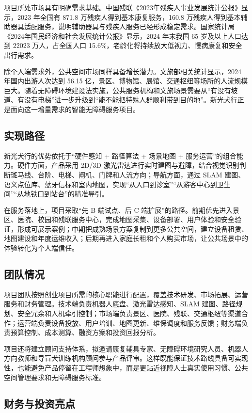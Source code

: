 \documentclass[a4paper,fontset=none]{ctexart}
\begin{document}
项目所处市场具有明确需求基础。中国残联《2023年残疾人事业发展统计公报》显示，2023 年全国有 871.8 万残疾人得到基本康复服务，160.8 万残疾人得到基本辅助器具适配服务，说明辅助器具与残疾人服务已经形成稳定需求。国家统计局《2024年国民经济和社会发展统计公报》显示，2024 年末我国 65 岁及以上人口达到 22023 万人，占全国人口 15.6\%，老龄化将持续放大低视力、慢病康复和安全出行需求。

除个人端需求外，公共空间市场同样具备增长潜力。文旅部相关统计显示，2024 年国内出游人次达到 56.15 亿，景区、博物馆、展馆、交通枢纽等场所的人流规模巨大。随着无障碍环境建设法实施，公共服务机构和文旅场景需要从“有没有坡道、有没有电梯”进一步升级到“能不能把特殊人群顺利带到目的地”。新光犬行正是面向这一增量需求的智能无障碍服务项目。

\subsection{实现路径}

新光犬行的优势依托于“硬件感知 + 路径算法 + 场景地图 + 服务运营”的组合能力。硬件方面，产品采用 2D/3D 激光雷达进行实时建图与避障，结合视觉识别判断斑马线、台阶、电梯、闸机、门牌和人流方向；导航方面，通过 SLAM 建图、语义点位库、蓝牙信标和室内地图，实现“从入口到诊室”“从游客中心到卫生间”“从地铁口到站台”的精准导引。

在服务落地上，项目采取“先 B 端试点、后 C 端扩展”的路径。前期优先进入景区、医院、校园和残联服务中心，完成地图采集、设备部署、用户体验和安全验证，形成可展示案例；中期把成熟场景方案复制到更多公共空间，建立设备租赁、地图建设和年度运维收入；后期再进入家庭长租和个人购买市场，让公共场景中的体验转化为个人端信任。

\subsection{团队情况}

项目团队按照创业项目所需的核心职能进行配置，覆盖技术研发、市场拓展、运营服务和财务管理。技术端负责机器人底盘、激光雷达感知、SLAM 建图、路径规划、安全冗余和人机牵引控制；市场端负责景区、医院、残联、交通枢纽等渠道合作；运营端负责设备投放、用户培训、地图更新、维保调度和服务反馈；财务端负责预算控制、成本测算、融资方案和投资回报分析。

项目还将建立顾问支持体系，拟邀请康复辅具专家、无障碍环境研究人员、机器人方向教师和导盲犬训练机构顾问参与产品评审。这样既能保证技术路线具备可实现性，也能避免产品停留在工程师想象中，而是更贴近视障人士真实使用习惯、公共空间管理要求和无障碍服务标准。

\subsection{财务与投资亮点}
\end{document}
